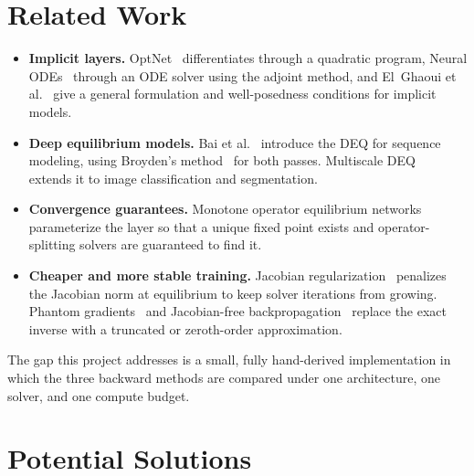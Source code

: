 \documentclass[11pt]{article}
\begin{document}
\section{Related Work}

\begin{itemize}
  \item \textbf{Implicit layers.} OptNet~\cite{amos2017optnet} differentiates
    through a quadratic program, Neural ODEs~\cite{chen2018neural} through an
    ODE solver using the adjoint method, and El~Ghaoui et
    al.~\cite{elghaoui2021implicit} give a general formulation and
    well-posedness conditions for implicit models.
  \item \textbf{Deep equilibrium models.} Bai et al.~\cite{bai2019deq}
    introduce the DEQ for sequence modeling, using Broyden's
    method~\cite{broyden1965class} for both passes. Multiscale
    DEQ~\cite{bai2020mdeq} extends it to image classification and segmentation.
  \item \textbf{Convergence guarantees.} Monotone operator equilibrium
    networks~\cite{winston2020monotone} parameterize the layer so that a unique
    fixed point exists and operator-splitting solvers are guaranteed to find it.
  \item \textbf{Cheaper and more stable training.} Jacobian
    regularization~\cite{bai2021stabilizing} penalizes the Jacobian norm at
    equilibrium to keep solver iterations from growing. Phantom
    gradients~\cite{geng2021training} and Jacobian-free
    backpropagation~\cite{fung2022jfb} replace the exact inverse with a
    truncated or zeroth-order approximation.
\end{itemize}

The gap this project addresses is a small, fully hand-derived implementation in
which the three backward methods are compared under one architecture, one
solver, and one compute budget.

\section{Potential Solutions}
\end{document}
